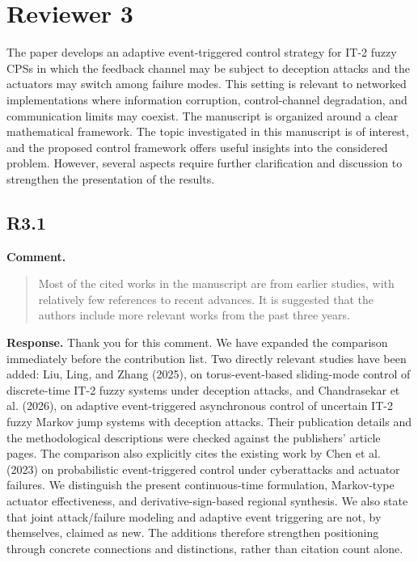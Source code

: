 \documentclass[12pt,a4paper]{article}
\begin{document}
\clearpage

\section*{Reviewer 3}

The paper develops an adaptive event-triggered control strategy for IT-2 fuzzy CPSs in which the feedback channel may be subject to deception attacks and the actuators may switch among failure modes. This setting is relevant to networked implementations where information corruption, control-channel degradation, and communication limits may coexist. The manuscript is organized around a clear mathematical framework. The topic investigated in this manuscript is of interest, and the proposed control framework offers useful insights into the considered problem. However, several aspects require further clarification and discussion to strengthen the presentation of the results.

\subsection*{R3.1}

\textbf{Comment.}
\begin{quote}
\raggedright
Most of the cited works in the manuscript are from earlier studies, with relatively few references to recent advances. It is suggested that the authors include more relevant works from the past three years.
\end{quote}

\textbf{Response.}
Thank you for this comment. We have expanded the comparison immediately before the contribution list. Two directly relevant studies have been added: Liu, Ling, and Zhang (2025), on torus-event-based sliding-mode control of discrete-time IT-2 fuzzy systems under deception attacks, and Chandrasekar et al. (2026), on adaptive event-triggered asynchronous control of uncertain IT-2 fuzzy Markov jump systems with deception attacks. Their publication details and the methodological descriptions were checked against the publishers’ article pages. The comparison also explicitly cites the existing work by Chen et al. (2023) on probabilistic event-triggered control under cyberattacks and actuator failures. We distinguish the present continuous-time formulation, Markov-type actuator effectiveness, and derivative-sign-based regional synthesis. We also state that joint attack/failure modeling and adaptive event triggering are not, by themselves, claimed as new. The additions therefore strengthen positioning through concrete connections and distinctions, rather than citation count alone.
\end{document}
